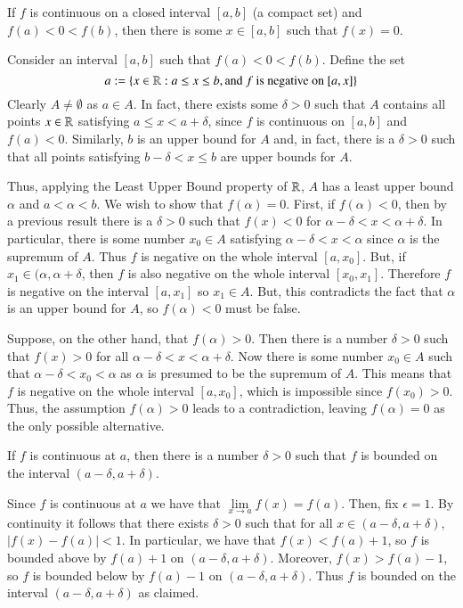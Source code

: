 \documentclass[12pt]{report}
\begin{document}
\begin{thm}{}{}
    If $f$ is continuous on a closed interval $[a,b]$ (a compact set) and $f(a) < 0 < f(b)$, then there is some $x \in [a,b]$ such that $f(x) = 0$.
\end{thm}
\begin{proof*}{}{}
    Consider an interval $[a,b]$ such that $f(a) < 0 < f(b)$. Define the set $$a := \{x\in \mathbb R:a\leq x \leq b,\text{and $f$ is negative on $[a,x]$}\}$$
    Clearly $A \neq \emptyset$ as $a \in A$. In fact, there exists some $\delta > 0$ such that $A$ contains all points $x \in \mathbb R$ satisfying $a \leq x < a+\delta$, since $f$ is continuous on $[a,b]$ and $f(a) < 0$. Similarly, $b$ is an upper bound for $A$ and, in fact, there is a $\delta > 0$ such that all points satisfying $b-\delta < x \leq b$ are upper bounds for $A$.

    Thus, applying the Least Upper Bound property of $\mathbb R$, $A$ has a least upper bound $\alpha$ and $a<\alpha < b$. We wish to show that $f(\alpha) = 0$. First, if $f(\alpha) < 0$, then by a previous result there is a $\delta > 0$ such that $f(x) < 0$ for $\alpha - \delta < x < \alpha + \delta$. In particular, there is some number $x_0 \in A$ satisfying $\alpha - \delta < x < \alpha$ since $\alpha$ is the supremum of $A$. Thus $f$ is negative on the whole interval $[a,x_0]$. But, if $x_1 \in (\alpha, \alpha+\delta$, then $f$ is also negative on the whole interval $[x_0,x_1]$. Therefore $f$ is negative on the interval $[a,x_1]$ so $x_1 \in A$. But, this contradicts the fact that $\alpha$ is an upper bound for $A$, so $f(\alpha) < 0$ must be false.


    Suppose, on the other hand, that $f(\alpha) > 0$. Then there is a number $\delta > 0$ such that $f(x) > 0$ for all $\alpha - \delta < x < \alpha + \delta$. Now there is some number $x_0 \in A$ such that $\alpha - \delta < x_0 < \alpha$ as $\alpha$ is presumed to be the supremum of $A$. This means that $f$ is negative on the whole interval $[a,x_0]$, which is impossible since $f(x_0) > 0$. Thus, the assumption $f(\alpha) > 0$ leads to a contradiction, leaving $f(\alpha) = 0$ as the only possible alternative. 
\end{proof*}

\begin{lem}{}{}
    If $f$ is continuous at $a$, then there is a number $\delta > 0$ such that $f$ is bounded on the interval $(a-\delta, a+\delta)$.
\end{lem}
\begin{proof*}{}{}
    Since $f$ is continuous at $a$ we have that $\lim\limits_{x\rightarrow a}f(x) = f(a)$. Then, fix $\epsilon = 1$. By continuity it follows that there exists $\delta > 0$ such that for all $x \in (a-\delta, a+\delta)$, $|f(x) - f(a)| < 1$. In particular, we have that $f(x) < f(a) + 1$, so $f$ is bounded above by $f(a)+1$ on $(a-\delta,a+\delta)$. Moreover, $f(x) > f(a) - 1$, so $f$ is bounded below by $f(a) -1$ on $(a-\delta, a+\delta)$. Thus $f$ is bounded on the interval $(a-\delta,a+\delta)$ as claimed.
\end{proof*}
\end{document}
